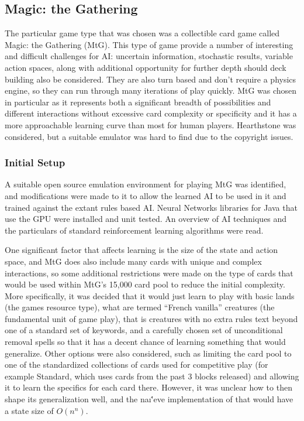   \subsection{Magic: the Gathering}
  The particular game type that was chosen was a collectible card game called Magic: the Gathering (MtG). This type of game provide a number of interesting and difficult challenges for AI: uncertain information, stochastic results, variable action spaces, along with additional opportunity for further depth should deck building also be considered. They are also turn based and don't require a physics engine, so they can run through many iterations of play quickly. MtG was chosen in particular as it represents both a significant breadth of possibilities and different interactions without excessive card complexity or specificity and it has a more approachable learning curve than most for human players. Hearthstone was considered, but a suitable emulator was hard to find due to the copyright issues. 
 \subsubsection{Initial Setup}
      A suitable open source emulation environment for playing MtG was identified, and modifications were made to it to allow the learned AI to be used in it and trained against the extant rules based AI. Neural Networks libraries for Java that use the GPU were installed and unit tested. An overview of AI techniques and the particulars of standard reinforcement learning algorithms were read.
      
One significant factor that affects learning is the size of the state and action space, and MtG does also include many cards with unique and complex interactions, so some additional restrictions were made on the type of cards that would be used within MtG's 15,000 card pool to reduce the initial complexity. More specifically, it was decided that it would just learn to play with basic lands (the games resource type), what are termed ``French vanilla'' creatures (the fundamental unit of game play), that is creatures with no extra rules text beyond one of a standard set of keywords, and a carefully chosen set of unconditional removal spells so that it has a decent chance of learning something that would generalize. Other options were also considered, such as limiting the card pool to one of the standardized collections of cards used for competitive play (for example Standard, which uses cards from the past 3 blocks released) and allowing it to learn the specifics for each card there. However, it was unclear how to then shape its generalization well, and the na\i\''eve implementation of that would have a state size of $O(n^n)$. 

